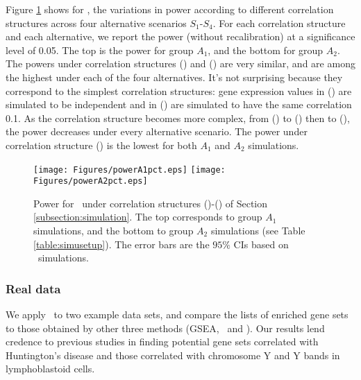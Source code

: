 	Figure \ref{fig:power} shows for \OurMethod, the variations in power according to different
	correlation structures across four alternative scenarios $S_1$-$S_4$. For each correlation 
	structure and each alternative, we report the power (without recalibration) at a significance 
	level of 0.05. The top is the power for group $A_1$, and the bottom for group $A_2$.  The 
	powers under correlation structures (\aaCase) and (\cCase) are very similar, and are among the 
	highest under each of the four alternatives. It's not surprising because they correspond to the 
	simplest correlation structures: gene expression values in (\aaCase) are simulated to be 
	independent and in (\cCase) are simulated to have the same correlation 0.1. As the correlation 
	structure becomes more complex, from (\aCase) to (\eCase) then
	to (\fCase), the power decreases under every alternative scenario. The power under correlation
	structure (\fCase) is the lowest for both $A_1$ and $A_2$ simulations.%
	
	\begin{figure}[!ht]
	\centering
			\texttt{[image: Figures/powerA1pct.eps]}
			\texttt{[image: Figures/powerA2pct.eps]}
		\caption[Power for \OurMethod~under correlation structures (\aaCase)-(\fCase)]{Power for 
		\OurMethod~under correlation structures (\aaCase)-(\fCase) of Section
			\ref{subsection:simulation}. The top corresponds to group $A_1$ simulations, and the 
			bottom to group
			$A_2$ simulations (see Table \ref{table:simusetup}). The error bars are the $95\%$ CIs 
			based on
			\HowmanySimu~simulations. }\label{fig:power}
	\end{figure} 
	

	\subsubsection{Real data}\label{section:realdata}
	We apply \OurMethod~to two example data sets, and compare the lists of enriched gene sets to 
	those obtained by other three methods (GSEA, \CMT~and \genr). %
	Our results lend credence to previous studies in finding potential gene sets correlated with
	Huntington's disease and those correlated with chromosome Y and Y bands in lymphoblastoid 
	cells.  
	
